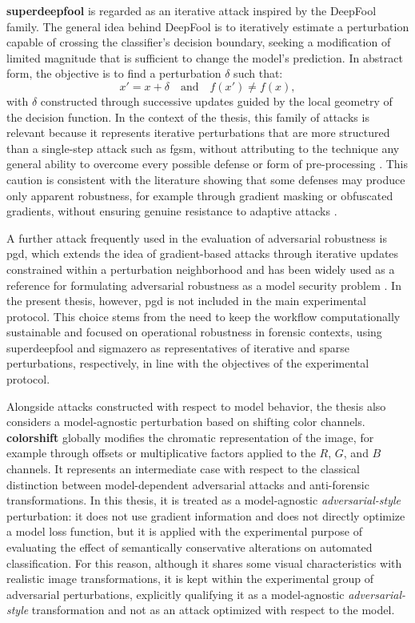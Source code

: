 \textbf{\gls{superdeepfool}} is regarded as an iterative attack inspired by
the DeepFool family. The general idea behind DeepFool is to iteratively
estimate a perturbation capable of crossing the classifier's decision boundary,
seeking a modification of limited magnitude that is sufficient to change the
model's prediction. In abstract form, the objective is to find a perturbation
\(\delta\) such that:
\[
x' = x + \delta
\quad \text{and} \quad
f(x') \neq f(x),
\]
with \(\delta\) constructed through successive updates guided by the local
geometry of the decision function. In the context of the thesis, this family of
attacks is relevant because it represents iterative perturbations that are more
structured than a single-step attack such as \gls{fgsm}, without attributing to
the technique any general ability to overcome every possible defense or form of
pre-processing \cite{moosavi2016deepfool,zhang2024superdeepfool}. This caution
is consistent with the literature showing that some defenses may produce only
apparent robustness, for example through gradient masking or obfuscated
gradients, without ensuring genuine resistance to adaptive attacks
\cite{athalye2018obfuscated}.

A further attack frequently used in the evaluation of adversarial robustness is
\gls{pgd}, which extends the idea of gradient-based attacks through iterative
updates constrained within a perturbation neighborhood and has been widely used
as a reference for formulating adversarial robustness as a model security
problem \cite{madry2018towards}. In the present thesis, however, \gls{pgd} is
not included in the main experimental protocol. This choice stems from the need
to keep the workflow computationally sustainable and focused on operational
robustness in forensic contexts, using \gls{superdeepfool} and \gls{sigmazero}
as representatives of iterative and sparse perturbations, respectively, in line
with the objectives of the experimental protocol.

Alongside attacks constructed with respect to model behavior, the thesis also
considers a model-agnostic perturbation based on shifting color channels.
\textbf{\gls{colorshift}} globally modifies the chromatic representation of the
image, for example through offsets or multiplicative factors applied to the
\(R\), \(G\), and \(B\) channels. It represents an intermediate case with
respect to the classical distinction between model-dependent adversarial attacks
and anti-forensic transformations. In this thesis, it is treated as a
model-agnostic \textit{adversarial-style} perturbation: it does not use
gradient information and does not directly optimize a model loss function, but
it is applied with the experimental purpose of evaluating the effect of
semantically conservative alterations on automated classification. For this
reason, although it shares some visual characteristics with realistic image
transformations, it is kept within the experimental group of adversarial
perturbations, explicitly qualifying it as a model-agnostic
\textit{adversarial-style} transformation and not as an attack optimized with
respect to the model.


